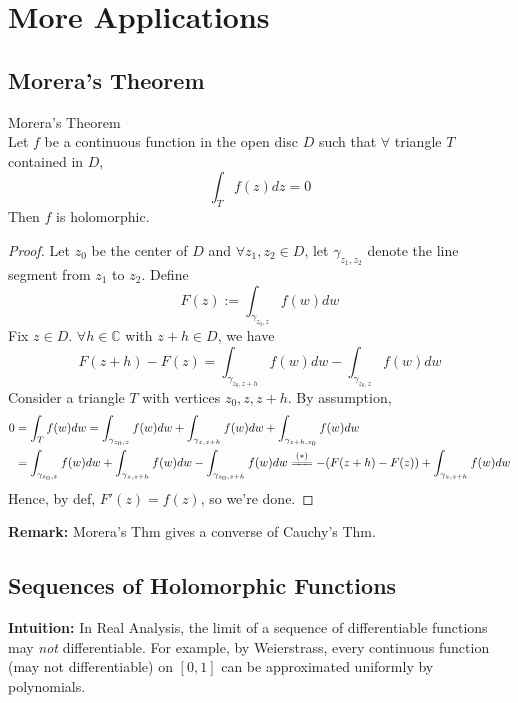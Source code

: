 \section{More Applications}

\subsection{Morera's Theorem}

\begin{theorem}{Morera's Theorem}\\
Let $f$ be a continuous function in the open disc $D$ such that $\forall$ triangle $T$ contained in $D$,
\[
\int_T f(z)dz=0
\]
Then $f$ is holomorphic.
\end{theorem}

\begin{proof}
    Let $z_0$ be the center of $D$ and $\forall z_1,z_2 \in D$, let $\gamma_{z_1,z_2}$ denote the line segment from $z_1$ to $z_2$. Define
    \[
    F(z):= \int_{\gamma_{z_0,z}} f(w)dw
    \]
    Fix $z\in D$. $\forall h\in \mathbb{C}$ with $z+h \in D$, we have
    \begin{equation*}
        F(z+h)- F(z)= \int_{\gamma_{z_0,z+h}} f(w)dw- \int_{\gamma_{z_0,z}} f(w)dw \tag{*}
    \end{equation*}
    Consider a triangle $T$ with vertices $z_0,z,z+h$. By assumption,
    \begin{align*}
        0&= \int_T f(w)dw = \int_{\gamma_{z_0,z}} f(w)dw+ \int_{\gamma_{z,z+h}} f(w)dw + \int_{\gamma_{z+h, z_0}} f(w)dw\\
        &= \int_{\gamma_{z_0,z}} f(w)dw+ \int_{\gamma_{z,z+h}} f(w)dw - \int_{\gamma_{z_0, z+h}} f(w)dw \xlongequal{(*)} -(F(z+h)-F(z)) + \int_{\gamma_{z,z+h}} f(w)dw
    \end{align*}
    Hence, by def, $F'(z)= f(z)$, so we're done.
\end{proof}

\noindent\textbf{Remark:} Morera's Thm gives a converse of Cauchy's Thm.

\subsection{Sequences of Holomorphic Functions}

\noindent\textbf{Intuition:} In Real Analysis, the limit of a sequence of differentiable functions may \textit{not} differentiable. For example, by Weierstrass, every continuous function (may not differentiable) on $[0,1]$ can be approximated uniformly by polynomials.

